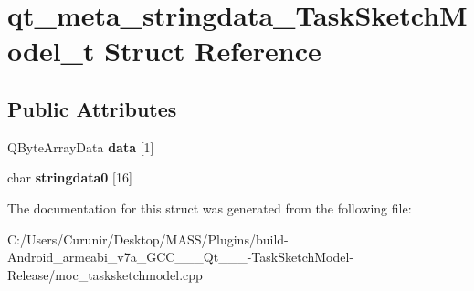 \hypertarget{structqt__meta__stringdata___task_sketch_model__t}{}\section{qt\+\_\+meta\+\_\+stringdata\+\_\+\+Task\+Sketch\+Model\+\_\+t Struct Reference}
\label{structqt__meta__stringdata___task_sketch_model__t}
\subsection*{Public Attributes}
\begin{DoxyCompactItemize}
\item 
\mbox{\label{structqt__meta__stringdata___task_sketch_model__t_ad7f0c5f19e0c23adb4bf8505835425eb}} 
Q\+Byte\+Array\+Data {\bfseries data} \mbox{[}1\mbox{]}
\item 
\mbox{\label{structqt__meta__stringdata___task_sketch_model__t_af868e7bd11b0516e7e1528e69e06d72e}} 
char {\bfseries stringdata0} \mbox{[}16\mbox{]}
\end{DoxyCompactItemize}


The documentation for this struct was generated from the following file\+:\begin{DoxyCompactItemize}
\item 
C\+:/\+Users/\+Curunir/\+Desktop/\+M\+A\+S\+S/\+Plugins/build-\/\+Android\+\_\+armeabi\+\_\+v7a\+\_\+\+G\+C\+C\+\_\+\_\+\_\+\+Qt\+\_\+\_\+\_-\/\+Task\+Sketch\+Model-\/\+Release/moc\+\_\+tasksketchmodel.\+cpp\end{DoxyCompactItemize}
